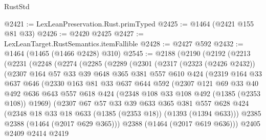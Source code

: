 \begin{lexlean}{RustStd}
\begin{coremodule}
@2421 := LexLeanPreservation.Rust.primTyped
@2425 := @1464 (@2421 @155 @81 @33)
@2426 := @2420 @2425
@2427 := LexLeanTarget.RustSemantics.itemFallible
@2428 := @2427 @592
@2432 := @1464 (@1465 (@1466 @2428) @310)
@2545 := @2188
    (@2190
      (@2192
        (@2213
          (@2231
            (@2248
              (@2274
                (@2285
                  (@2289
                    (@2301
                      (@2317
                        (@2323 (@2426 @2432))
                        (@2307
                          @164
                          @57
                          @33
                          @39
                          @648
                          @365
                          @381
                          @557
                          @610
                          @424
                          (@2319
                            @164
                            @33
                            @637
                            @646
                            (@2330
                              @163
                              @81
                              @33
                              @637
                              @644
                              @592
                              (@2307
                                @121
                                @69
                                @33
                                @40
                                @492
                                @636
                                @643
                                @557
                                @618
                                @424
                                (@2348 @108 @33 @108 @492 (@1385 (@2353 @108)) @1969)
                                (@2307
                                  @67
                                  @57
                                  @33
                                  @39
                                  @633
                                  @365
                                  @381
                                  @557
                                  @628
                                  @424
                                  (@2348 @18 @33 @18 @633 (@1385 (@2353 @18)) (@1393 (@1394 @633)))
                                  @2385
                                  @2388
                                  (@1464 (@2017 @629 @365)))
                                @2388
                                (@1464 (@2017 @619 @636)))
                              @2405
                              @2409
                              @2414
                              @2419

\end{coremodule}
\end{lexlean}
